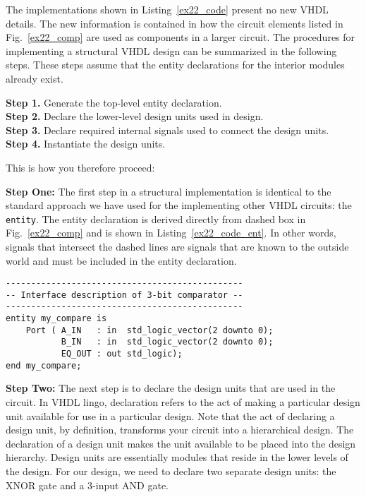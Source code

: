 The implementations shown in Listing~\ref{ex22_code} present no new VHDL details. The new information is contained in how the circuit elements listed in Fig.~\ref{ex22_comp} are used as components in a larger circuit. The procedures for implementing a structural VHDL design can be summarized in the following steps. These steps assume that the entity declarations for the interior modules already exist.

\noindent
\textbf{Step 1.} Generate the top-level entity declaration.\\
\textbf{Step 2.} Declare the lower-level design units used in design.\\
\textbf{Step 3.} Declare required internal signals used to connect the design units.\\
\textbf{Step 4.} Instantiate the design units.

This is how you therefore proceed:

\noindent
\textbf{Step One:} The first step in a structural implementation is identical to the standard approach we have used for the implementing other VHDL circuits: the \texttt{entity}. The entity declaration is derived directly from dashed box in Fig.~\ref{ex22_comp} and is shown in Listing~\ref{ex22_code_ent}. In other words, signals that intersect the dashed lines are signals that are known to the outside world and must be included in the entity declaration.

\noindent
\begin{minipage}{0.99\linewidth}
\begin{lstlisting}[label=ex22_code_ent, caption=Entity declaration for 3-bit comparator.]
-----------------------------------------------
-- Interface description of 3-bit comparator --
-----------------------------------------------
entity my_compare is
    Port ( A_IN   : in  std_logic_vector(2 downto 0);
           B_IN   : in  std_logic_vector(2 downto 0);
           EQ_OUT : out std_logic);
end my_compare;
\end{lstlisting}
\end{minipage}

\noindent
\textbf{Step Two:} The next step is to declare the design units that are used in the circuit. In VHDL lingo, declaration refers to the act of making a particular design unit available for use in a particular design. Note that the act of declaring a design unit, by definition, transforms your circuit into a hierarchical design. The declaration of a design unit makes the unit available to be placed into the design hierarchy. Design units are essentially modules that reside in the lower levels of the design. For our design, we need to declare two separate design units: the XNOR gate and a 3-input AND gate.

